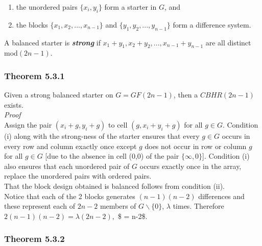 \documentclass[
  12pt,
  a4paper]{book}
\begin{document}
\begin{enumerate}
\def\labelenumi{\arabic{enumi}.}
\item
  the unordered pairs \(\{x_i,y_i\}\) form a starter in \(G\), and
\item
  the blocks \(\{x_1,x_2,...,x_{n-1}\}\) and \(\{y_1,y_2,...,y_{n-1}\}\)
  form a difference system.
\end{enumerate}

A balanced starter is \textbf{\emph{strong}} if
\(x_1+y_1,x_2+y_2,...,x_{n-1}+y_{n-1}\) are all distinct mod\((2n-1)\).

\hypertarget{theorem-5.3.1}{%
\subsubsection{Theorem 5.3.1}\label{theorem-5.3.1}}

Given a strong balanced starter on \(G=GF(2n-1)\), then a \(CBHR(2n-1)\)
exists.\\
\emph{Proof}\\
Assign the pair \((x_i+g,y_i+g)\) to cell \((g,x_i+y_i+g)\) for all
\(g \in G\). Condition (i) along with the strong-ness of the starter
ensures that every \(g \in G\) occurs in every row and column exactly
once except \(g\) does not occur in row or column \(g\) for all
\(g \in G\) {[}due to the absence in cell (0,0) of the pair
\(\{\infty,0\}\){]}. Condition (i) also ensures that each unordered pair
of \(G\) occurs exactly once in the array, replace the unordered pairs
with ordered pairs.\\
That the block design obtained is balanced follows from condition
(ii).\\
Notice that each of the 2 blocks generates \((n-1)(n-2)\) differences
and these represent each of \(2n-2\) members of \(G \backslash \{0\}\),
\(\lambda\) times. Therefore \(2(n-1)(n-2) = \lambda (2n-2),\) \$
\Rightarrow \lambda = n-2\$.

\hypertarget{theorem-5.3.2}{%
\subsubsection{Theorem 5.3.2}\label{theorem-5.3.2}}
\end{document}
